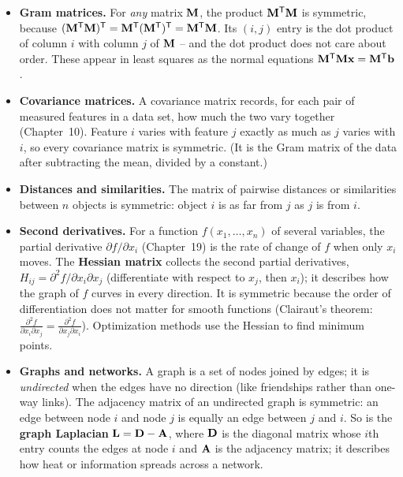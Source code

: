 \begin{itemize}
  \item \textbf{Gram matrices.} For \emph{any} matrix $\mathbf{M}$, the product
        $\mathbf{M}^{\mathsf{T}}\mathbf{M}$ is symmetric, because
        $(\mathbf{M}^{\mathsf{T}}\mathbf{M})^{\mathsf{T}} = \mathbf{M}^{\mathsf{T}}(\mathbf{M}^{\mathsf{T}})^{\mathsf{T}} = \mathbf{M}^{\mathsf{T}}\mathbf{M}$.
        Its $(i,j)$ entry is the dot product of column $i$ with column $j$ of
        $\mathbf{M}$ -- and the dot product does not care about order. These appear
        in least squares as the normal equations $\mathbf{M}^{\mathsf{T}}\mathbf{M}\mathbf{x} =
        \mathbf{M}^{\mathsf{T}}\mathbf{b}$.
  \item \textbf{Covariance matrices.} A covariance matrix records, for each pair
        of measured features in a data set, how much the two vary together
        (Chapter~10). Feature $i$ varies with feature $j$ exactly as much as $j$
        varies with $i$, so every covariance matrix is symmetric. (It is the Gram
        matrix of the data after subtracting the mean, divided by a constant.)
  \item \textbf{Distances and similarities.} The matrix of pairwise distances or
        similarities between $n$ objects is symmetric: object $i$ is as far from
        $j$ as $j$ is from $i$.
  \item \textbf{Second derivatives.} For a function $f(x_1,\dots,x_n)$ of several
        variables, the partial derivative $\partial f/\partial x_i$ (Chapter~19) is the rate
        of change of $f$ when only $x_i$ moves. The \textbf{Hessian matrix}
        collects the second partial derivatives,
        $H_{ij} = \partial^2 f / \partial x_i \partial x_j$ (differentiate with
        respect to $x_j$, then $x_i$); it describes how the graph of $f$ curves in
        every direction. It is symmetric because the order of differentiation
        does not matter for smooth functions (Clairaut's theorem:
        $\frac{\partial^2 f}{\partial x_i \partial x_j} =
        \frac{\partial^2 f}{\partial x_j \partial x_i}$). Optimization methods
        use the Hessian to find minimum points.
  \item \textbf{Graphs and networks.} A graph is a set of nodes joined by edges;
        it is \emph{undirected} when the edges have no direction (like
        friendships rather than one-way links). The adjacency matrix of an
        undirected graph is symmetric: an edge between node $i$ and node $j$ is
        equally an edge between $j$ and $i$. So is the \textbf{graph Laplacian}
        $\mathbf{L} = \mathbf{D} - \mathbf{A}$, where $\mathbf{D}$ is the diagonal matrix
        whose $i$th entry counts the edges at node $i$ and $\mathbf{A}$ is the
        adjacency matrix; it describes how heat or information spreads across
        a network.
\end{itemize}

